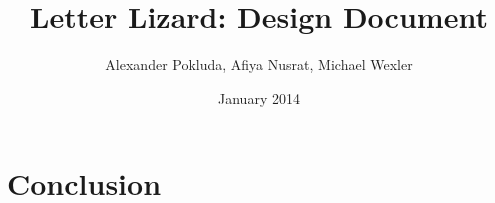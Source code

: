 \documentclass[12pt]{article}
\begin{document}
\title{Letter Lizard: Design Document}

\author{Alexander Pokluda, Afiya Nusrat, Michael Wexler}

\date{January 2014}

\maketitle


\tableofcontents







\section{Conclusion}



\end{document}
